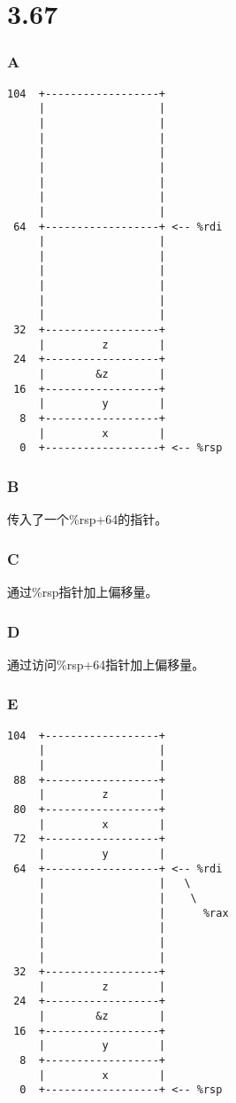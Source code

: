 \documentclass[11pt]{article}
\begin{document}
\section*{3.67}

\subsubsection*{A}
\begin{lstlisting}[basicstyle=\small\ttfamily,extendedchars=false]
104  +------------------+
     |                  |
     |                  |
     |                  |
     |                  |
     |                  |
     |                  |
     |                  |
     |                  |
 64  +------------------+ <-- %rdi
     |                  |
     |                  |
     |                  |
     |                  |
     |                  |
     |                  |
 32  +------------------+
     |         z        |
 24  +------------------+
     |        &z        |
 16  +------------------+
     |         y        |
  8  +------------------+
     |         x        |
  0  +------------------+ <-- %rsp
\end{lstlisting}

\subsubsection*{B}
传入了一个\%rsp+64的指针。

\subsubsection*{C}
通过\%rsp指针加上偏移量。

\subsubsection*{D}
通过访问\%rsp+64指针加上偏移量。

\subsubsection*{E}
\begin{lstlisting}[basicstyle=\small\ttfamily,extendedchars=false]
104  +------------------+
     |                  |
     |                  |
 88  +------------------+
     |         z        |
 80  +------------------+
     |         x        |
 72  +------------------+
     |         y        |
 64  +------------------+ <-- %rdi
     |                  |   \
     |                  |    \
     |                  |      %rax
     |                  |
     |                  |
     |                  |
 32  +------------------+
     |         z        |
 24  +------------------+
     |        &z        |
 16  +------------------+
     |         y        |
  8  +------------------+
     |         x        |
  0  +------------------+ <-- %rsp
\end{lstlisting}
\end{document}
